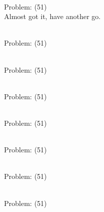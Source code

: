 \documentclass[11pt]{article}
\begin{document}
\begin{minipage}[t]{0.5\textwidth}
  {\centering
  
\\
Problem: (51)\\
Almost got it, have another go.\\
  }
\end{minipage}
\begin{minipage}[t]{0.5\textwidth}
  {\centering
  
\\
Problem: (51)\\
  }
\end{minipage}
\begin{minipage}[t]{0.5\textwidth}
  {\centering
  
\\
Problem: (51)\\
  }
\end{minipage}
\begin{minipage}[t]{0.5\textwidth}
  {\centering
  
\\
Problem: (51)\\
  }
\end{minipage}
\begin{minipage}[t]{0.5\textwidth}
  {\centering
  
\\
Problem: (51)\\
  }
\end{minipage}
\begin{minipage}[t]{0.5\textwidth}
  {\centering
  
\\
Problem: (51)\\
  }
\end{minipage}
\begin{minipage}[t]{0.5\textwidth}
  {\centering
  
\\
Problem: (51)\\
  }
\end{minipage}
\begin{minipage}[t]{0.5\textwidth}
  {\centering
  
\\
Problem: (51)\\
  }
\end{minipage}
\end{document}
